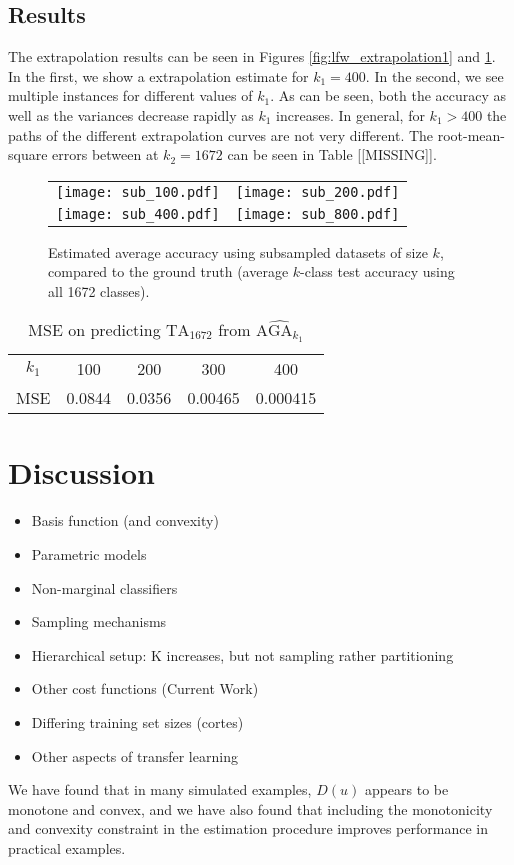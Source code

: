 \documentclass[twoside,11pt]{article}
\begin{document}
\subsection{Results}

The extrapolation results can be seen in Figures \ref{fig:lfw_extrapolation1}  and \ref{fig:lfw_extrapolation2}. In the first, we show a extrapolation estimate for $k_1 = 400$. In the second, we see multiple instances for different values of $k_1$. As can be seen, both the accuracy as well as the variances decrease rapidly as $k_1$ increases. In general, for $k_1>400$ the paths of the different extrapolation curves are not very different. The root-mean-square errors between at $k_2=1672$ can be seen in Table [[MISSING]].

\begin{figure}
\centering
\begin{tabular}{cc}
\texttt{[image: sub\_100.pdf]} &
\texttt{[image: sub\_200.pdf]} \\
\texttt{[image: sub\_400.pdf]} &
\texttt{[image: sub\_800.pdf]} 
\end{tabular}
\caption{Estimated average accuracy using subsampled datasets of size
  $k$, compared to the ground truth (average $k$-class test accuracy
  using all 1672 classes).}
\label{fig:lfw_extrapolation2}
\end{figure}

\begin{table}
\centering
\begin{tabular}{c||c|c|c|c}
$k_1$ & 100 & 200 & 300 & 400 \\
MSE & 0.0844 & 0.0356 & 0.00465 & 0.000415
\end{tabular}
\caption{MSE on predicting $\text{TA}_{1672}$ from $\widehat{\text{AGA}_{k_1}}$}
\end{table}

\section{Discussion}

\begin{itemize}
\item Basis function (and convexity)
\item Parametric models
\item Non-marginal classifiers
\item Sampling mechanisms
\item Hierarchical setup: K increases, but not sampling rather partitioning
\item Other cost functions (Current Work)
\item Differing training set sizes (cortes)
\item Other aspects of transfer learning
\end{itemize}
 
We have found that in many simulated examples, $D(u)$ appears to be
monotone and convex, and we have also found that including the
monotonicity and convexity constraint in the estimation procedure
improves performance in practical examples.



\end{document}
